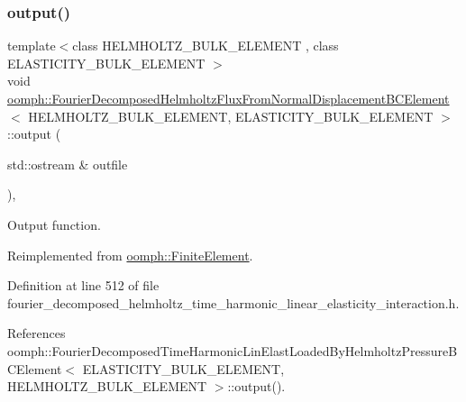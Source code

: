 \subsubsection{\texorpdfstring{output()}{output()}\hspace{0.1cm}{\footnotesize\ttfamily [1/4]}}
{\footnotesize\ttfamily template$<$class H\+E\+L\+M\+H\+O\+L\+T\+Z\+\_\+\+B\+U\+L\+K\+\_\+\+E\+L\+E\+M\+E\+NT , class E\+L\+A\+S\+T\+I\+C\+I\+T\+Y\+\_\+\+B\+U\+L\+K\+\_\+\+E\+L\+E\+M\+E\+NT $>$ \\
void \hyperlink{classoomph_1_1FourierDecomposedHelmholtzFluxFromNormalDisplacementBCElement}{oomph\+::\+Fourier\+Decomposed\+Helmholtz\+Flux\+From\+Normal\+Displacement\+B\+C\+Element}$<$ H\+E\+L\+M\+H\+O\+L\+T\+Z\+\_\+\+B\+U\+L\+K\+\_\+\+E\+L\+E\+M\+E\+NT, E\+L\+A\+S\+T\+I\+C\+I\+T\+Y\+\_\+\+B\+U\+L\+K\+\_\+\+E\+L\+E\+M\+E\+NT $>$\+::output (\begin{DoxyParamCaption}\item[{std\+::ostream \&}]{outfile }\end{DoxyParamCaption})\hspace{0.3cm}{\ttfamily [inline]}, {\ttfamily [virtual]}}



Output function. 



Reimplemented from \hyperlink{classoomph_1_1FiniteElement_a2ad98a3d2ef4999f1bef62c0ff13f2a7}{oomph\+::\+Finite\+Element}.



Definition at line 512 of file fourier\+\_\+decomposed\+\_\+helmholtz\+\_\+time\+\_\+harmonic\+\_\+linear\+\_\+elasticity\+\_\+interaction.\+h.



References oomph\+::\+Fourier\+Decomposed\+Time\+Harmonic\+Lin\+Elast\+Loaded\+By\+Helmholtz\+Pressure\+B\+C\+Element$<$ E\+L\+A\+S\+T\+I\+C\+I\+T\+Y\+\_\+\+B\+U\+L\+K\+\_\+\+E\+L\+E\+M\+E\+N\+T, H\+E\+L\+M\+H\+O\+L\+T\+Z\+\_\+\+B\+U\+L\+K\+\_\+\+E\+L\+E\+M\+E\+N\+T $>$\+::output().

\mbox{\label{classoomph_1_1FourierDecomposedHelmholtzFluxFromNormalDisplacementBCElement_ac69b78e1f4cf73d3dbe07d8e1dbfe0b1}} 
